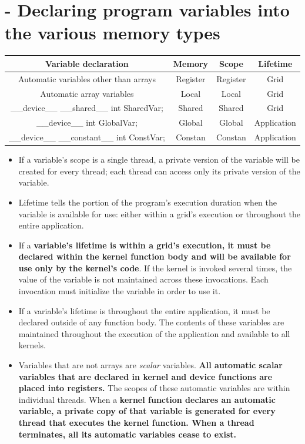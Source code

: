 \section{- Declaring program variables into the various memory types}
\begin{center}
    \begin{tabular}{c|c|c|c}
        Variable declaration                          & Memory   & Scope    & Lifetime    \\
        \hline
        Automatic variables other than arrays         & Register & Register & Grid        \\
        Automatic array variables                     & Local    & Local    & Grid        \\
        \_\_device\_\_ \_\_shared\_\_ int SharedVar;  & Shared   & Shared   & Grid        \\
        \_\_device\_\_ int GlobalVar;                 & Global   & Global   & Application \\
        \_\_device\_\_ \_\_constant\_\_ int ConstVar; & Constan  & Constan  & Application \\
    \end{tabular}
\end{center}
\begin{itemize}
    \item If a variable’s scope is a single thread, a private version of the variable will be created for every thread; each thread can access only its private version of the variable.
    \item Lifetime tells the portion of the program’s execution duration when the variable is available for use: either within a grid’s execution or throughout the entire application.
    \item If a \textbf{variable’s lifetime is within a grid’s execution, it must be declared within the kernel function body and will be available for use only by the kernel’s code}. If the kernel is invoked several times, the value of the variable is not maintained across these invocations. Each invocation must initialize the variable in order to use it.
    \item If a variable’s lifetime is throughout the entire application, it must be declared outside of any function body. The contents of these variables are maintained throughout the execution of the application and available to all kernels.
    \item Variables that are not arrays are \textsl{scalar} variables. \textbf{All automatic scalar variables that are declared in kernel and device functions are placed into registers.} The scopes of these automatic variables are within individual threads. When a \textbf{kernel function declares an automatic variable, a private copy of that variable is generated for every thread that executes the kernel function. When a thread terminates, all its automatic variables cease to exist.}
\end{itemize}